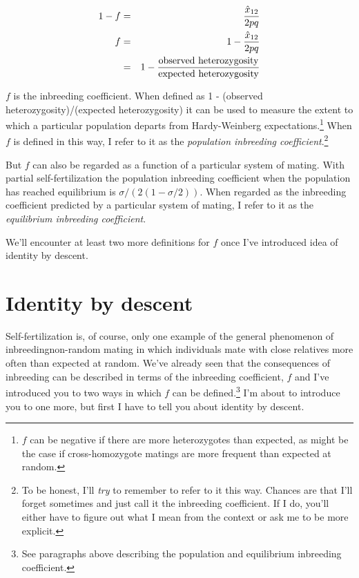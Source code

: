 \begin{eqnarray}
1-f &=& \frac{\hat x_{12}}{2pq} \\
  f &=& 1 - \frac{\hat x_{12}}{2pq} \\
    &=& 1 - \frac{\hbox{observed heterozygosity}}%
                 {\hbox{expected heterozygosity}}
\end{eqnarray}

$f$ is the inbreeding coefficient. When defined as 1 - (observed
heterozygosity)/(expected heterozygosity) it can be used to measure
the extent to which a particular population departs from
Hardy-Weinberg expectations.\footnote{$f$ can be negative if there are
  more heterozygotes than expected, as might be the case if
  cross-homozygote matings are more frequent than expected at random.}
When $f$ is defined in this way, I refer to it as the {\it population
  inbreeding coefficient}.\footnote{To be honest, I'll {\it try\/} to
  remember to refer to it this way. Chances are that I'll forget
  sometimes and just call it the inbreeding coefficient. If I do,
  you'll either have to figure out what I mean from the context or ask
  me to be more explicit.}

But $f$ can also be regarded as a function of a particular system of
mating. With partial self-fertilization the population inbreeding
coefficient when the population has reached equilibrium is
$\sigma/(2(1-\sigma/2))$. When regarded as the inbreeding coefficient
predicted by a particular system of mating, I refer to it as the {\it
  equilibrium inbreeding coefficient}.

We'll encounter at least two more definitions for $f$ once I've
introduced idea of identity by descent.

\section*{Identity by descent}

Self-fertilization is, of course, only one example of the general
phenomenon of inbreeding{\dash}non-random mating in which individuals
mate with close relatives more often than expected at random. We've
already seen that the consequences of inbreeding can be described in
terms of the inbreeding coefficient, $f$ and I've introduced you to
two ways in which $f$ can be defined.\footnote{See paragraphs above
describing the population and equilibrium inbreeding coefficient.} I'm
about to introduce you to one more, but first I have to tell you about
identity by descent.

